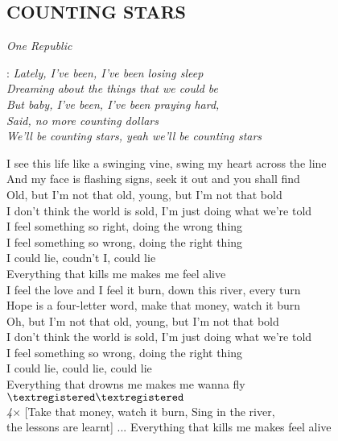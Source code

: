 \begin{flushleft}
	\section*{\Huge COUNTING STARS}
	\emph{One Republic}
\end{flushleft}

\textregistered:
\emph{
Lately, I've been, I've been losing sleep\\
Dreaming about the things that we could be\\
But baby, I've been, I've been praying hard,\\
Said, no more counting dollars\\
We'll be counting stars, yeah we'll be counting stars\\
}

I see this life like a swinging vine, swing my heart across the line\\
And my face is flashing signs, seek it out and you shall find\\
Old, but I'm not that old, young, but I'm not that bold\\
I don't think the world is sold, I'm just doing what we're told\\
I feel something so right, doing the wrong thing\\
I feel something so wrong, doing the right thing\\
I could lie, coudn't I, could lie\\
Everything that kills me makes me feel alive \hspace{1 cm}\textregistered \textregistered\\

I feel the love and I feel it burn, down this river, every turn\\
Hope is a four-letter word, make that money, watch it burn\\
Oh, but I'm not that old, young, but I'm not that bold\\
I don't think the world is sold, I'm just doing what we're told\\
I feel something so wrong, doing the right thing\\
I could lie, could lie, could lie\\
Everything that drowns me makes me wanna fly \hspace{1cm} $\textregistered\textregistered$\\

\emph{4$\times$} [Take that money, watch it burn, Sing in the river,\\
the lessons are learnt] \hspace{1 cm}... Everything that kills me makes feel alive
\newpage